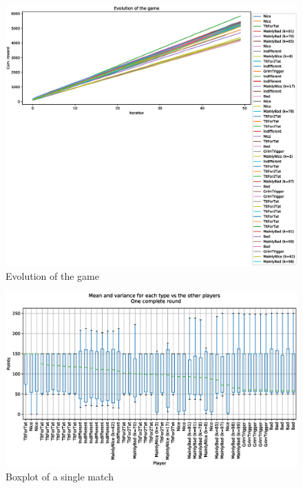 \documentclass[journal,a4paper,10pt,twoside]{IEEEtran} %
\begin{document}
\begin{figure}[!ht]
    \centering
    \includegraphics[width=1\columnwidth]{../img/ipdmp/ipdmp-evolution-of-game-50}
    \caption{Evolution of the game}
    \label{fig:boxIPDMPevo}
\end{figure}

\begin{figure}[!ht]
    \centering
    \includegraphics[width=1\columnwidth]{../img/ipdmp/ipdmp-boxplot-single-match-50}
    \caption{Boxplot of a single match}
    \label{fig:boxIPDMPsingle}
\end{figure}
\end{document}
